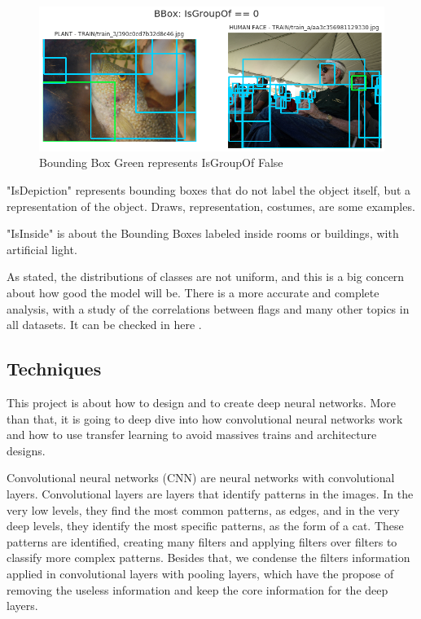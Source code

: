 \documentclass[11pt, a4paper, onecolumn]{article}
\begin{document}
\begin{figure}[!ht]
	\centering
	\includegraphics[width=1\textwidth]{isgroupof-false.png}
	\caption{\scriptsize Bounding Box Green represents IsGroupOf False}
\end{figure}

"IsDepiction" represents bounding boxes that do not label the object itself, but a representation of the object. Draws, representation, costumes, are some examples.

"IsInside" is about the Bounding Boxes labeled inside rooms or buildings, with artificial light.

As stated, the distributions of classes are not uniform, and this is a big concern about how good the model will be. There is a more accurate and complete analysis, with a study of the correlations between flags and many other topics in all datasets. It can be checked in here \cite{eda}.

\subsection{Techniques}

This project is about how to design and to create deep neural networks. More than that, it is going to deep dive into how convolutional neural networks work and how to use transfer learning to avoid massives trains and architecture designs.

Convolutional neural networks (CNN) are neural networks with convolutional layers. Convolutional layers are layers that identify patterns in the images. In the very low levels, they find the most common patterns, as edges, and in the very deep levels, they identify the most specific patterns, as the form of a cat. These patterns are identified, creating many filters and applying filters over filters to classify more complex patterns. Besides that, we condense the filters information applied in convolutional layers with pooling layers, which have the propose of removing the useless information and keep the core information for the deep layers. \cite{cnn:1}
\end{document}
